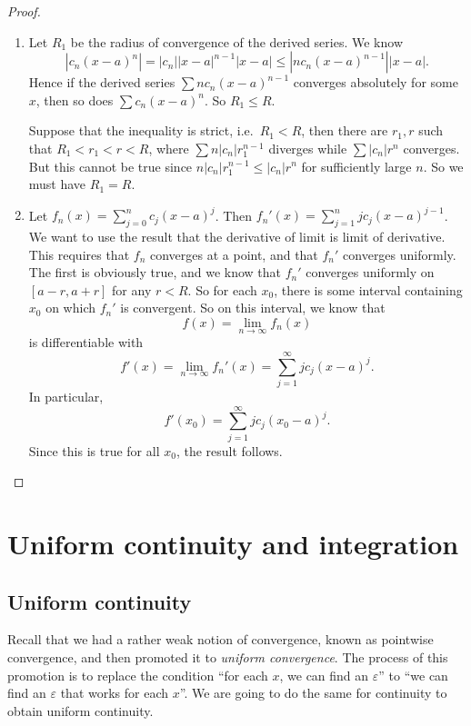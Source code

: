 \documentclass[a4paper]{article}
\begin{document}
\begin{proof}\leavevmode
  \begin{enumerate}
    \item Let $R_1$ be the radius of convergence of the derived series. We know
      \[
        |c_n(x - a)^n| = |c_n||x - a|^{n - 1}|x - a| \leq |n c_n (x - a)^{n - 1}| |x - a|.
      \]
      Hence if the derived series $\sum n c_n(x - a)^{n - 1}$ converges absolutely for some $x$, then so does $\sum c_n (x - a)^n$. So $R_1 \leq R$.

      Suppose that the inequality is strict, i.e.\ $R_1 < R$, then there are $r_1, r$ such that $R_1 < r_1 < r < R$, where $\sum n|c_n| r_1^{n - 1}$ diverges while $\sum |c_n| r^n$ converges. But this cannot be true since $n|c_n| r_1^{n - 1} \leq |c_n| r^n$ for sufficiently large $n$. So we must have $R_1 = R$.

    \item Let $f_n(x) = \sum\limits_{j = 0}^n c_j (x - a)^j$. Then $f_n '(x) = \sum\limits_{j = 1}^n j c_j (x - a)^{j - 1}$. We want to use the result that the derivative of limit is limit of derivative. This requires that $f_n$ converges at a point, and that $f_n'$ converges uniformly. The first is obviously true, and we know that $f_n'$ converges uniformly on $[a - r, a + r]$ for any $r < R$. So for each $x_0$, there is some interval containing $x_0$ on which $f_n'$ is convergent. So on this interval, we know that
      \[
        f(x) = \lim_{n \to \infty}f_n (x)
      \]
      is differentiable with
      \[
        f'(x) = \lim_{n \to \infty}f_n'(x) = \sum_{j = 1}^\infty jc_j (x - a)^j.
      \]
      In particular,
      \[
        f'(x_0) = \sum_{j = 1}^\infty jc_j (x_0 - a)^j.
      \]
      Since this is true for all $x_0$, the result follows.
  \end{enumerate}
\end{proof}

\section{Uniform continuity and integration}
\subsection{Uniform continuity}
Recall that we had a rather weak notion of convergence, known as pointwise convergence, and then promoted it to \emph{uniform convergence}. The process of this promotion is to replace the condition ``for each $x$, we can find an $\varepsilon$'' to ``we can find an $\varepsilon$ that works for each $x$''. We are going to do the same for continuity to obtain uniform continuity.
\end{document}
